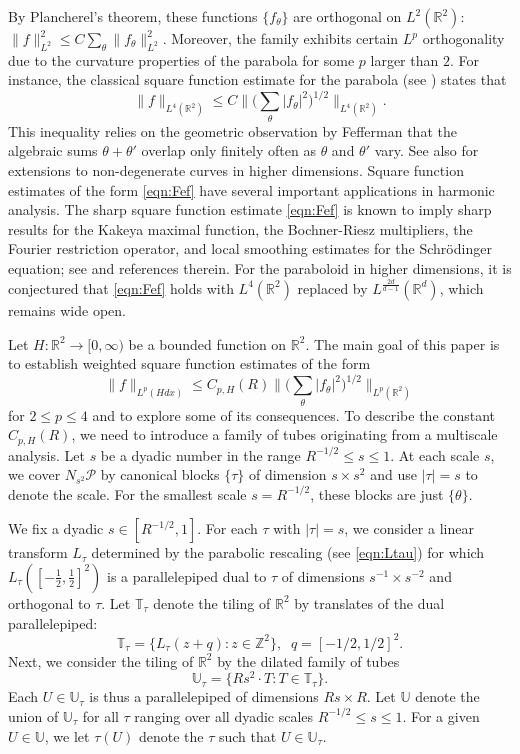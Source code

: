 \documentclass[11pt]{amsart}
\theoremstyle{definition}
\theoremstyle{remark}
\newcommand{\R}{\mathbb{R}}
\newcommand{\cP}{\mathcal{P}}
\newcommand{\Z}{\mathbb{Z}}
\newcommand{\T}{\mathbb{T}}
\newcommand{\U}{\mathbb{U}}
\begin{document}
By Plancherel's theorem, these functions $\{ f_\theta\}$ are orthogonal on $L^2(\R^2)$: $\| f\|_{L^2}^2 \leq C \sum_{\theta} \| f_\theta \|_{L^2}^2$. Moreover, the family  exhibits certain $L^p$ orthogonality due to the curvature properties of the parabola for some $p$ larger than $2$. For instance, the classical square function estimate for the parabola (see \cite{Co}) states that 
\begin{equation}\label{eqn:Fef}
 \|f\|_{L^4(\R^2)} \leq C \big\| \big(\sum_\theta |f_\theta|^2 \big)^{1/2}\big\|_{L^4(\R^2)}.
\end{equation}
This inequality relies on the geometric observation by Fefferman \cite{Fe} that the algebraic sums $\theta+ \theta'$ overlap only finitely often as $\theta$ and $\theta'$ vary. See also \cite{GGPRY,Mal, GM2} for extensions to non-degenerate curves in higher dimensions. Square function estimates of the form \eqref{eqn:Fef} have several important applications in harmonic analysis. The sharp square function estimate \eqref{eqn:Fef} is known to imply sharp results for the Kakeya maximal function, the Bochner-Riesz multipliers,  the Fourier restriction operator, and local smoothing estimates for the Schr\"odinger equation; see \cite{Carbery, Yung} and references therein. For the paraboloid in higher dimensions, it is conjectured that \eqref{eqn:Fef} holds with $L^4(\R^2)$ replaced by $L^{\frac{2d}{d-1}}(\R^d)$, which remains wide open. 

Let $H: \R^2 \to [0,\infty)$ be a bounded function on $\R^2$. The main goal of this paper is to establish weighted square function estimates of the form
\[ 
	\|f\|_{L^p(Hdx)} \le C_{p,H}(R) \big\| \big(\sum_\theta |f_\theta|^2 \big)^{1/2}\big\|_{L^p(\R^2)}
\]
for $2\leq p\leq 4$ and to explore some of its consequences. To describe the constant $C_{p,H}(R)$, we need to introduce a family of tubes originating from a multiscale analysis. Let $s$ be a dyadic number in the range $R^{-1/2}\le s\le1$. At each scale $s$, we cover $N_{s^2} \cP$  by canonical blocks $\{\tau \}$ of dimension $s\times s^{2}$ and use $|\tau|=s$ to denote the scale. For the smallest scale $s=R^{-1/2}$, these blocks are just $\{ \theta \}$. 

We fix a dyadic $s\in [R^{-1/2},1]$. For each $\tau$ with $|\tau|=s$, we consider a linear transform $L_\tau$ determined by the parabolic rescaling (see \eqref{eqn:Ltau}) for which $L_\tau ( [-\frac1 2,\frac 1 2]^2 )$ is a parallelepiped dual to $\tau$ of dimensions $s^{-1} \times s^{-2}$ and orthogonal to $\tau$. Let $\T_{\tau}$ denote the tiling of $\R^2$ by  translates of the dual parallelepiped: 
\begin{equation}\label{set of tube}
		\T_{\tau} = \{ L_\tau(z+q): z\in \Z^2 \}, \;\; q=[-1/2,1/2]^2.
\end{equation}
Next, we consider the tiling of $\R^2$ by the dilated family of tubes
\[
\U_{\tau} = \{ Rs^2 \cdot T : T\in \T_\tau \}.
\]
Each $U\in \U_{\tau}$ is thus a parallelepiped of dimensions $Rs \times R$. 
Let $\U$ denote the union of $\U_{\tau}$ for all $\tau$ ranging over all dyadic scales $R^{-1/2}\leq s \leq 1$. For a given $U\in \U$, we let $\tau(U)$ denote the $\tau$ such that $U\in \U_{\tau}$.
\end{document}

